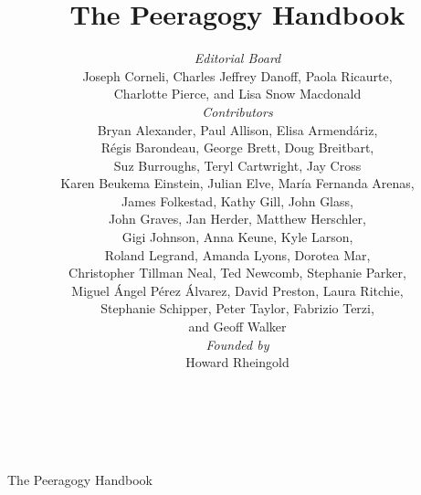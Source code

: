 \documentclass[ebook, 12pt, twoside]{memoir}
\begin{document}
%
\sloppy \pagestyle{empty} \thispagestyle{empty}
\begin{center}
\quad\\[1in] 
{\LARGE The Peeragogy Handbook}
\end{center}
\clearpage\mbox{}\clearpage    %
\title{The Peeragogy Handbook\\[.5in]}
\author{

\emph{Editorial Board}\\
{\small Joseph Corneli, Charles Jeffrey Danoff, Paola Ricaurte,}\\
{\small Charlotte Pierce, and Lisa Snow Macdonald} \\[.25in]

\emph{Contributors} \\
{\small Bryan Alexander, Paul Allison, Elisa Armend\'ariz,} \\
{\small R\'egis Barondeau, George Brett, Doug Breitbart,}\\ 
{\small Suz Burroughs, Teryl Cartwright, Jay Cross}\\
{\small Karen Beukema Einstein, Julian Elve, Mar\'ia Fernanda Arenas,}\\
{\small James Folkestad, Kathy Gill, John Glass,} \\
{\small John Graves, Jan Herder, Matthew Herschler,} \\
{\small Gigi Johnson, Anna Keune, Kyle Larson,} \\
{\small Roland Legrand, Amanda Lyons, Dorotea Mar,} \\
{\small Christopher Tillman Neal, Ted Newcomb, Stephanie Parker,} \\
{\small Miguel \'Angel P\'erez \'Alvarez, David Preston, Laura Ritchie,} \\
{\small Stephanie Schipper, Peter Taylor, Fabrizio Terzi,}\\
{\small and Geoff Walker}\\[.25in]

\emph{Founded by}\\
{\small Howard Rheingold}\\[.25in]
}

\date{~}
\maketitle
\thispagestyle{empty}
\end{document}
